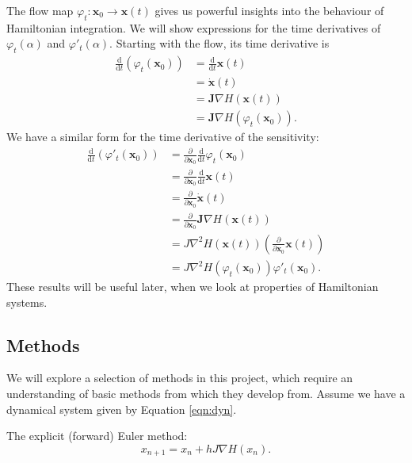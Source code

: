 \documentclass{report}
\theoremstyle{exampstyle} \newtheorem{example}[theorem]{Example}
\theoremstyle{exampstyle} \newtheorem{remark}[theorem]{Remark}
\theoremstyle{exampstyle} \newtheorem{definition}[theorem]{Definition}
\theoremstyle{exampstyle} \newtheorem{lemma}[theorem]{Lemma}
\begin{document}
The flow map $\varphi_t: \mathbf{x}_0 \rightarrow \mathbf{x}(t)$ gives us powerful insights into the behaviour of Hamiltonian integration.
We will show expressions for the time derivatives of $\varphi_t(\alpha)$ and $\varphi'_t(\alpha)$.
Starting with the flow, its time derivative is
\begin{align*}
	\frac{\mathrm{d}}{\mathrm{d}t} \left( \varphi_t(\mathbf{x}_0) \right) &= \frac{\mathrm{d}}{\mathrm{d}t} \mathbf{x}(t) \\
	&= \dot{\mathbf{x}}(t) \\
	&= \mathbf{J}\nabla H(\mathbf{x}(t)) \\
	&= \mathbf{J}\nabla H \left( \varphi_t(\mathbf{x}_0) \right).
\end{align*}
We have a similar form for the time derivative of the sensitivity:
\begin{align*}
	\frac{\mathrm{d}}{\mathrm{d}t} \left( \varphi'_t(\mathbf{x}_0) \right) &= \frac{\partial}{\partial \mathbf{x}_0} \frac{\mathrm{d}}{\mathrm{d}t} \varphi_t(\mathbf{x}_0) \\
	&= \frac{\partial}{\partial \mathbf{x}_0} \frac{\mathrm{d}}{\mathrm{d}t} \mathbf{x}(t) \\
	&= \frac{\partial}{\partial \mathbf{x}_0} \dot{\mathbf{x}}(t) \\
	&= \frac{\partial}{\partial \mathbf{x}_0} \mathbf{J}\nabla H(\mathbf{x}(t)) \\
	&= J \nabla^2 H(\mathbf{x}(t)) \left(\frac{\partial}{\partial \mathbf{x}_0} \mathbf{x}(t)\right) \\
	&= J \nabla^2 H(\varphi_t(\mathbf{x}_0))\varphi'_t(\mathbf{x}_0).
\end{align*}
These results will be useful later, when we look at properties of Hamiltonian systems.

\subsection{Methods}

We will explore a selection of methods in this project,
which require an understanding of basic methods from which they develop from.
Assume we have a dynamical system given by Equation \ref{eqn:dyn}.

The explicit (forward) Euler method:
\begin{equation}
	x_{n+1} = x_n + h J \nabla H(x_n).
\end{equation}
\end{document}
